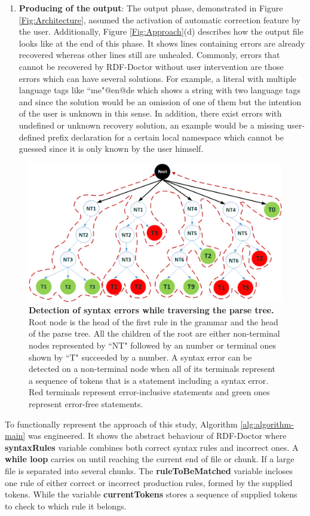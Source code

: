 \begin{enumerate}[label=(\alph*)]
\item\textbf {Producing of the output}: The output phase, demonstrated in Figure \ref{Fig:Architecture}, assumed the activation of automatic correction feature by the user. Additionally, {Figure \ref{Fig:Approach}}(d) describes how the output file looks like at the end of this phase. It shows lines containing errors are already recovered whereas other lines still are unhealed. Commonly, errors that cannot be recovered by RDF-Doctor without user intervention are those errors which can have several solutions. For example, a literal with multiple language tags like ``me"@en@de which shows a string with two language tags and since the solution would be an omission of one of them but the intention of the user is unknown in this sense. In addition, there exist errors with undefined or unknown recovery solution, an example would be a missing user-defined prefix declaration for a certain local namespace which cannot be guessed since it is only known by the user himself. 
\end{enumerate} 
\begin{figure}
	\centering
	  	\includegraphics[width=.8\textwidth]{images/approachParseTree.png}
		\caption{\textbf{Detection of syntax errors while traversing the parse tree.} 
		Root node is the head of the first rule in the grammar and the head of the parse tree.
		All the children of the root are either non-terminal nodes represented by ``NT" followed by an number or  terminal ones shown by ``T" succeeded by a number. 
		A syntax error can be detected on a non-terminal node when all of its terminals represent a sequence of tokens that is a statement including a syntax error. Red terminals represent error-inclusive statements and green ones represent error-free statements.}
		\label{Fig:approachParseTree}  
\end{figure}


To functionally represent the approach of this study, Algorithm \ref{alg:algorithm-main} was engineered. 
It shows the abstract behaviour of RDF-Doctor where \textbf{syntaxRules} variable combines both correct syntax rules and incorrect ones. 
A \textbf{while loop} carries on until reaching the current end of file or chunk. If a large file is separated into several chunks. The \textbf{ruleToBeMatched} variable incloses one rule of either correct or incorrect production rules, formed by the supplied tokens. While the variable \textbf{currentTokens} stores a sequence of supplied tokens to check to which rule it belongs.  

